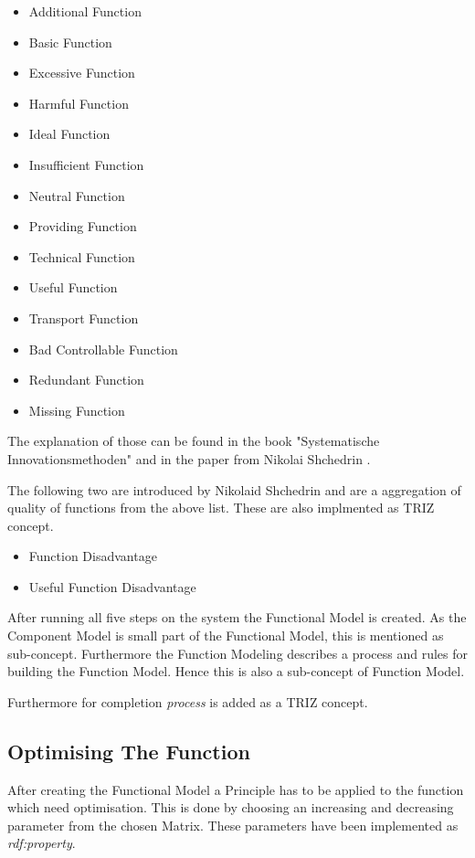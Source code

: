 \documentclass[11pt,a4paper]{article}
\begin{document}
\begin{itemize}
\item Additional Function
\item Basic Function
\item Excessive Function
\item Harmful Function
\item Ideal Function
\item Insufficient Function
\item Neutral Function
\item Providing Function
\item Technical Function
\item Useful Function
\item Transport Function
\item Bad Controllable Function
\item Redundant Function
\item Missing Function
\end{itemize}

The explanation of those can be found in the book "Systematische
Innovationsmethoden" \cite{KS} and in the paper from Nikolai Shchedrin
\cite{WebinarFunctionAnalysis}.

The following two are introduced by Nikolaid Shchedrin and are a aggregation
of quality of functions from the above list.  These are also implmented as
TRIZ concept.

\begin{itemize}
\item Function Disadvantage
\item Useful Function Disadvantage
\end{itemize}

After running all five steps on the system the Functional Model is created.
As the Component Model is small part of the Functional Model, this is
mentioned as sub-concept.  Furthermore the Function Modeling describes a
process and rules for building the Function Model.  Hence this is also a
sub-concept of Function Model.

Furthermore for completion \textit{process} is added as a TRIZ concept.

\subsection{Optimising The Function}

After creating the Functional Model a Principle has to be applied to the
function which need optimisation.  This is done by choosing an increasing and
decreasing parameter from the chosen Matrix.  These parameters have been
implemented as \textit{rdf:property}.
\end{document}
